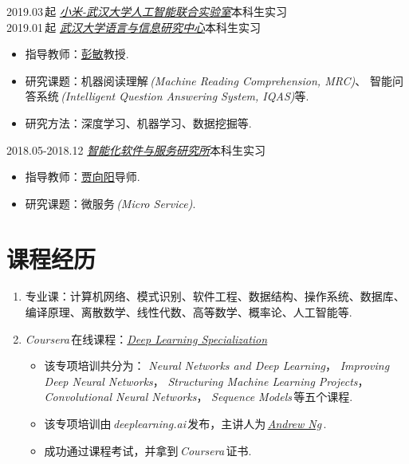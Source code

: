 \documentclass[letterpaper,AutoFakeBold]{twentysecondcv} %
\begin{document}
2019.03\,起 \qquad\qquad \href{cs.whu.edu.cn/news_show.aspx?id=871}{\emph{小米-武汉大学人工智能联合实验室}}\hfill 本科生实习
\\2019.01\,起 \qquad\qquad \href{http://sc.whu.edu.cn/}{\emph{武汉大学语言与信息研究中心}}\hfill 本科生实习
\begin{itemize}
	\item 指导教师：\href{http://li3.whu.edu.cn/article/56.html}{彭敏}教授.
	\item 研究课题：机器阅读理解\,\emph{(Machine Reading Comprehension, MRC)}、
	智能问答系统\,\emph{(Intelligent Question Answering System, IQAS)}等.
	\item 研究方法：深度学习、机器学习、数据挖掘等.
\end{itemize}
2018.05-2018.12 \qquad \href{http://csold.whu.edu.cn/plus/view.php?aid=18}{\emph{智能化软件与服务研究所}}\hfill 本科生实习
\begin{itemize}
	\item 指导教师：\href{http://cs.whu.edu.cn/teacherinfo.aspx?id=201}{贾向阳}导师.
	\item 研究课题：微服务\,\emph{(Micro Service)}.
\end{itemize}




\section{\large 课程经历}


\begin{enumerate}
	\setlength{\itemsep}{0pt}
	\setlength{\parsep}{0pt}
	\setlength{\parskip}{0pt}
	\item 专业课：计算机网络、模式识别、软件工程、数据结构、操作系统、数据库、编译原理、离散数学、线性代数、高等数学、概率论、人工智能等.
	\item \emph{Coursera\,}在线课程：\href{https://www.coursera.org/specializations/deep-learning}{\emph{Deep Learning Specialization}}
		\begin{itemize}
			\item 该专项培训共分为：
			\emph{Neural Networks and Deep Learning}，
			\emph{Improving Deep Neural Networks}，
			\emph{Structuring Machine Learning Projects}，
			\emph{Convolutional Neural Networks}，
			\emph{Sequence Models}\,等五个课程.
			\item 该专项培训由\,\emph{deeplearning.ai}\,发布，主讲人为\,\href{https://www.coursera.org/instructor/andrewng}{\emph{Andrew Ng}}\,.
			\item 成功通过课程考试，并拿到\,\emph{Coursera}\,证书.
		\end{itemize}
\end{enumerate}
\end{document}

